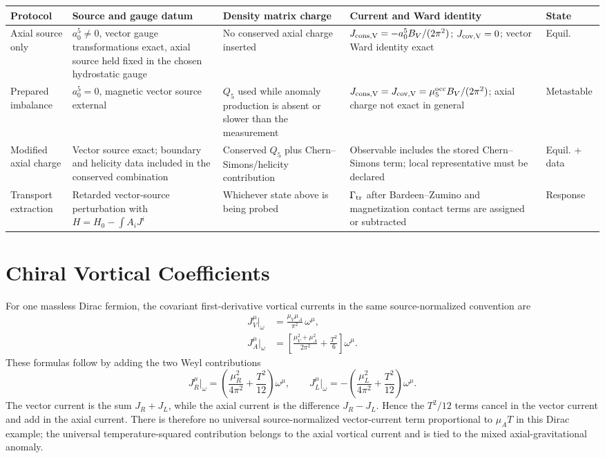 \begin{center}
\scriptsize
\setlength{\tabcolsep}{2pt}
\begin{tabular}{@{}>{\raggedright\arraybackslash}p{}
  >{\raggedright\arraybackslash}p{}
  >{\raggedright\arraybackslash}p{}
  >{\raggedright\arraybackslash}p{}
  >{\raggedright\arraybackslash}p{}@{}}
Protocol & Source and gauge datum & Density matrix charge & Current and Ward identity & State \\
\hline
Axial source only &
\(a_0^5\ne0\), vector gauge transformations exact, axial source held fixed
in the chosen hydrostatic gauge &
No conserved axial charge inserted &
\(J_{\rm cons,V}=-a_0^5B_V/(2\pi^2)\);
\(J_{\rm cov,V}=0\); vector Ward identity exact &
Equil. \\
Prepared imbalance &
\(a_0^5=0\), magnetic vector source external &
\(Q_5\) used while anomaly production is absent or slower than the
measurement &
\(J_{\rm cons,V}=J_{\rm cov,V}=\mu_5^{\rm occ}B_V/(2\pi^2)\);
axial charge not exact in general &
Metastable \\
Modified axial charge &
Vector source exact; boundary and helicity data included in the conserved
combination &
Conserved \(Q_5\) plus Chern--Simons/helicity contribution &
Observable includes the stored Chern--Simons term; local representative must
be declared &
Equil. + data \\
Transport extraction &
Retarded vector-source perturbation with \(H=H_0-\int A_iJ^i\) &
Whichever state above is being probed &
\(\Gamma_{\rm tr}\) after Bardeen--\allowbreak Zumino and magnetization contact terms
are assigned or subtracted &
Response
\end{tabular}
\end{center}

\section{Chiral Vortical Coefficients}

For one massless Dirac fermion, the covariant first-derivative vortical
currents in the same source-normalized convention are
\begin{align}
  J_V^\mu\big|_\omega
  &=
  \frac{\mu_V\mu_A}{\pi^2}\,\omega^\mu ,
  \label{eq:vector-cve-dirac}\\
  J_A^\mu\big|_\omega
  &=
  \left[
    \frac{\mu_V^2+\mu_A^2}{2\pi^2}
    +\frac{T^2}{6}
  \right]\omega^\mu .
  \label{eq:axial-cve-dirac}
\end{align}
These formulas follow by adding the two Weyl contributions
\[
  J_R^\mu\big|_\omega
  =
  \left(\frac{\mu_R^2}{4\pi^2}+\frac{T^2}{12}\right)\omega^\mu,
  \qquad
  J_L^\mu\big|_\omega
  =
  -\left(\frac{\mu_L^2}{4\pi^2}+\frac{T^2}{12}\right)\omega^\mu .
\]
The vector current is the sum \(J_R+J_L\), while the axial current is the
difference \(J_R-J_L\).  Hence the \(T^2/12\) terms cancel in the vector
current and add in the axial current.  There is therefore no universal
source-normalized vector-current term proportional to \(\mu_A T\) in this
Dirac example; the universal temperature-squared contribution belongs to the
axial vortical current and is tied to the mixed axial-gravitational anomaly.

